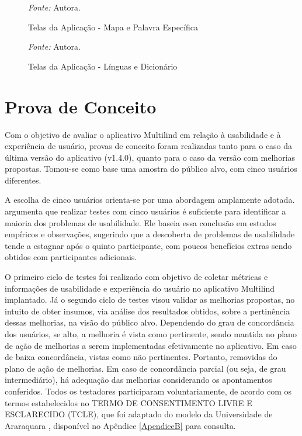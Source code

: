 \begin{figure}[h!]
	\centering
	\caption{Telas da Aplicação - Mapa e Palavra Específica}
	\begin{tablenotes}[flushleft]
		\centering
		\item \textit{Fonte:} Autora.
	\end{tablenotes}
	\label{fig18}
\end{figure}

\begin{figure}[h!]
	\centering
	\caption{Telas da Aplicação - Línguas e Dicionário}
	\begin{tablenotes}[flushleft]
		\centering
		\item \textit{Fonte:} Autora.
	\end{tablenotes}
	\label{fig19}
\end{figure}


\section{Prova de Conceito}
\label{sec:Prova de Conceito}
Com o objetivo de avaliar o aplicativo Multilind em relação à usabilidade e à experiência de usuário, provas de conceito foram 
realizadas tanto para o caso da última versão do aplicativo (v1.4.0), quanto para o caso da versão com melhorias propostas. Tomou-se como base uma amostra do público alvo, com cinco 
usuários diferentes.

A escolha de cinco usuários orienta-se por uma abordagem amplamente adotada.  argumenta que realizar testes com cinco usuários é suficiente para identificar a maioria dos problemas de 
usabilidade. Ele baseia essa conclusão em estudos empíricos e observações, sugerindo que a descoberta de problemas de usabilidade tende a estagnar após o quinto participante, com poucos benefícios 
extras sendo obtidos com participantes adicionais.

O primeiro ciclo de testes foi realizado com objetivo de coletar métricas e informações de usabilidade e experiência do usuário no aplicativo Multilind implantado. Já o segundo ciclo de testes visou validar as 
melhorias propostas, no intuito de obter insumos, via análise dos resultados obtidos, sobre a pertinência dessas melhorias, na visão do público alvo. Dependendo do grau de concordância dos usuários, se alto, a 
melhoria é vista como pertinente, sendo mantida no plano de ação de melhorias a serem implementadas efetivamente no aplicativo. Em caso de baixa concordância, vistas como não pertinentes. Portanto, removidas 
do plano de ação de melhorias. Em caso de concordância parcial (ou seja, de grau intermediário), há adequação das melhorias considerando os apontamentos conferidos. Todos os testadores participaram voluntariamente, 
de acordo com os termos estabelecidos no  TERMO DE CONSENTIMENTO LIVRE E ESCLARECIDO (TCLE), que foi adaptado do modelo da Universidade de Araraquara \cite{tcle}, disponível no Apêndice \ref{ApendiceB} para consulta.
 
